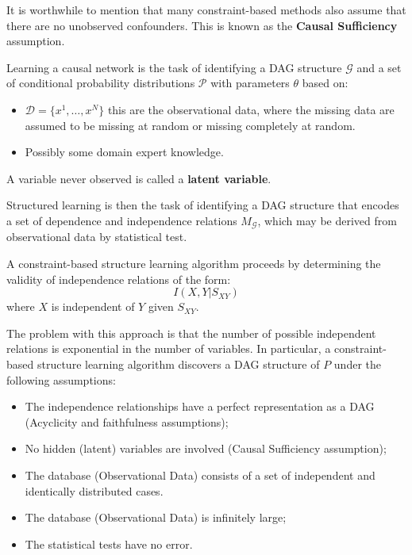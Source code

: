 It is worthwhile to mention that many constraint-based methods also assume that there
are no unobserved confounders. This is known as the \textbf{Causal Sufficiency}
assumption.

Learning a causal network is the task of identifying a DAG structure $\mathcal{G}$
and a set of conditional probability distributions $\mathcal{P}$ with parameters
$\theta$ based on:
\begin{itemize}
    \item $\mathcal{D} = \{x^1, \ldots, x^N\}$ this are the observational data,
          where the missing data are assumed to be missing at random or missing
          completely at random.
    \item Possibly some domain expert knowledge.
\end{itemize}

A variable never observed is called a \textbf{latent variable}.

Structured learning is then the task of identifying a DAG structure that encodes
a set of dependence and independence relations $M_{\mathcal{G}}$, which may be
derived from observational data by statistical test.

A constraint-based structure learning algorithm proceeds by determining the validity
of independence relations of the form:
\begin{equation}
    I(X, Y| S_{XY})
\end{equation}
where $X$ is independent of $Y$ given $S_{XY}$.

The problem with this approach is that the number of possible independent relations
is exponential in the number of variables. In particular, a constraint-based
structure learning algorithm discovers a DAG structure of $P$ under the following
assumptions:
\begin{itemize}
    \item The independence relationships have a perfect representation as a DAG
          (Acyclicity and faithfulness assumptions);
    \item No hidden (latent) variables are involved (Causal Sufficiency assumption);
    \item The database (Observational Data) consists of a set of independent and
          identically distributed cases.
    \item The database (Observational Data) is infinitely large;
    \item The statistical tests have no error.
\end{itemize}

